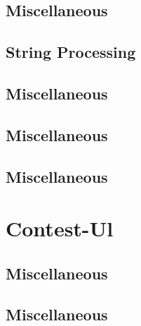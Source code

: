 \subsection{Miscellaneous}
\raggedbottom
\vspace{-.7\baselineskip}\hrulefill
\vspace{0.1\baselineskip}\subsection{String Processing}
\raggedbottom
\vspace{-.7\baselineskip}\hrulefill
\vspace{0.1\baselineskip}\subsection{Miscellaneous}
\raggedbottom
\vspace{-.7\baselineskip}\hrulefill
\vspace{0.1\baselineskip}\subsection{Miscellaneous}
\raggedbottom
\vspace{-.7\baselineskip}\hrulefill
\vspace{0.1\baselineskip}\subsection{Miscellaneous}
\raggedbottom
\vspace{-.7\baselineskip}\hrulefill
\vspace{0.1\baselineskip}
\section{Contest-Ul}
\subsection{Miscellaneous}
\raggedbottom
\vspace{-.7\baselineskip}\hrulefill
\vspace{0.1\baselineskip}\subsection{Miscellaneous}
\raggedbottom
\vspace{-.7\baselineskip}\hrulefill
\vspace{0.1\baselineskip}
